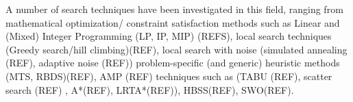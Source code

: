 A number of search techniques have been investigated in this field, ranging from mathematical optimization/ constraint satisfaction methods such as Linear and (Mixed) Integer Programming (LP, IP, MIP) (REFS), local search techniques (Greedy search/hill climbing)(REF), local search with noise (simulated annealing (REF), adaptive noise (REF)) problem-specific (and generic) heuristic methods (MTS, RBDS)(REF), AMP (REF) techniques such as (TABU (REF), scatter search (REF) , A*(REF), LRTA*(REF)), HBSS(REF), SWO(REF). 

